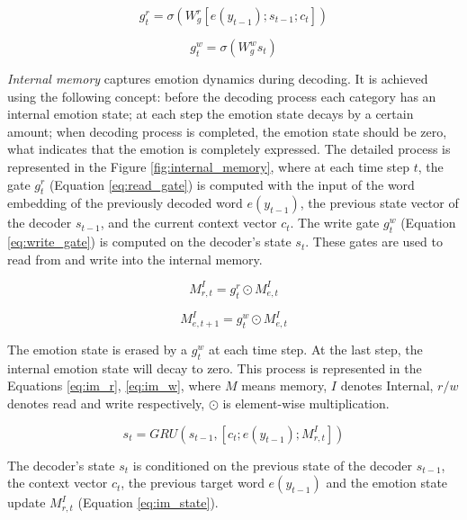 \begin{equation} \label{eq:read_gate}
g_t^r = \sigma(W_g^r[e(y_{t-1}); s_{t-1}; c_t])
\end{equation}

\begin{equation} \label{eq:write_gate}
g_t^w = \sigma(W_g^w s_t)
\end{equation}

\textit{Internal memory} captures emotion dynamics during decoding. It is achieved using the following concept: before the decoding process each category has an internal emotion state; at each step the emotion state decays by a certain amount; when decoding process is completed, the emotion state should be zero, what indicates that the emotion is completely expressed. The detailed process is represented in the Figure \ref{fig:internal_memory}, where at each time step $t$, the gate $g_t^r$ (Equation \ref{eq:read_gate}) is computed with the input of the word embedding of the previously decoded word $e(y_{t-1})$, the previous state vector of the decoder $s_{t-1}$, and the current context vector $c_t$. The write gate $g_t^w$ (Equation \ref{eq:write_gate}) is computed on the decoder's state $s_t$. These gates are used to read from and write into the internal memory.

\begin{equation} \label{eq:im_r}
M_{r,t}^I = g_t^r \odot M_{e,t}^I
\end{equation}

\begin{equation} \label{eq:im_w}
M_{e,t+1}^I = g_t^w \odot M_{e,t}^I
\end{equation}

The emotion state is erased by a $g_t^w$ at each time step. At the last step, the internal emotion state will decay to zero. This process is represented in the Equations \ref{eq:im_r}, \ref{eq:im_w}, where $M$ means memory, $I$ denotes Internal, $r/w$ denotes read and write respectively, $\odot$ is element-wise multiplication.

\begin{equation} \label{eq:im_state}
s_t = GRU(s_{t-1},[c_t; e(y_{t-1}); M_{r,t}^I])
\end{equation}

The decoder's state $s_t$ is conditioned on the previous state of the decoder $s_{t-1}$, the context vector $c_t$, the previous target word $e(y_{t-1})$ and the emotion state update $M_{r,t}^I$ (Equation \ref{eq:im_state}).

